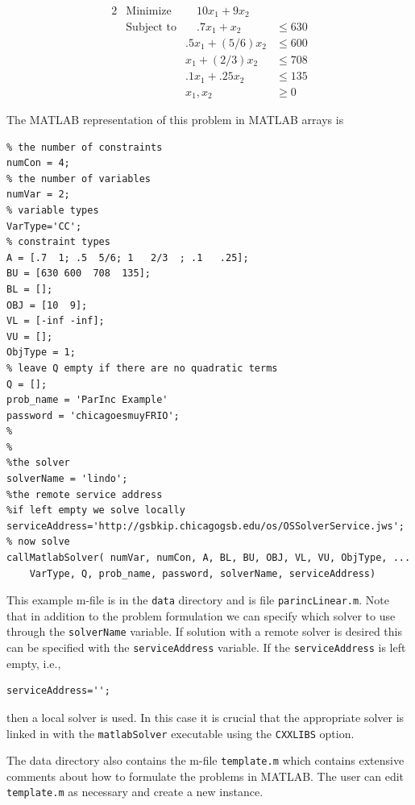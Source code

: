 \documentclass[11pt]{article}
\renewcommand{\_}{{\char"5F}}
\renewcommand{\{}{{\char"7B}}
\renewcommand{\}}{{\char"7D}}
\renewcommand{\^}{{\char"0D}}
\renewcommand{\'}{{\char"0D}}
\begin{document}
\begin{enumerate}[Step 1:]
\begin{alignat}{2}
& \mbox{Minimize} & \quad
10 x_{1} + 9 x_{2}\label{eq:parinobj}\\
& \mbox{Subject to} & \quad .7x_{1} + x_{2}  &\le 630  \label{eq:parinccon1}\\
& & .5x_{1} + (5/6) x_{2} &\le 600 \label{eq:parinccon2}\\
& &  x_{1} + (2/3) x_{2} &\le 708 \label{eq:parinccon3}\\
& & .1x_{1} + .25 x_{2} &\le 135 \label{eq:parinccon4}\\
& & x_{1}, x_{2} &\ge 0 \label{eq:parincnonneg}
\end{alignat}

The MATLAB representation of this problem in MATLAB arrays is
\begin{verbatim}
% the number of constraints
numCon = 4;
% the number of variables
numVar = 2;
% variable types
VarType='CC';
% constraint types
A = [.7  1; .5  5/6; 1   2/3  ; .1   .25];
BU = [630 600  708  135];
BL = [];
OBJ = [10  9];
VL = [-inf -inf];
VU = [];
ObjType = 1;
% leave Q empty if there are no quadratic terms
Q = [];
prob_name = 'ParInc Example'
password = 'chicagoesmuyFRIO';
%
%
%the solver
solverName = 'lindo';
%the remote service address
%if left empty we solve locally
serviceAddress='http://gsbkip.chicagogsb.edu/os/OSSolverService.jws';
% now solve
callMatlabSolver( numVar, numCon, A, BL, BU, OBJ, VL, VU, ObjType, ...
    VarType, Q, prob_name, password, solverName, serviceAddress)
\end{verbatim}
This example m-file is in the {\tt data} directory and is file {\tt parincLinear.m}. Note that in addition to the problem formulation
we can specify which solver to use through the {\tt solverName} variable.  If solution with a remote solver is desired
this can be specified with the {\tt serviceAddress} variable.  If the {\tt serviceAddress} is left empty, i.e.,
\begin{verbatim}
serviceAddress='';
\end{verbatim}
then a local solver is used. In this case  it is crucial that the appropriate solver is linked in with the {\tt matlabSolver}
executable using the {\tt CXXLIBS} option.


The data directory  also contains the m-file  {\tt template.m} which contains extensive comments about how to formulate
the problems in MATLAB.   The user can edit {\tt template.m} as necessary and create a new instance.





\end{enumerate}
\end{document}

